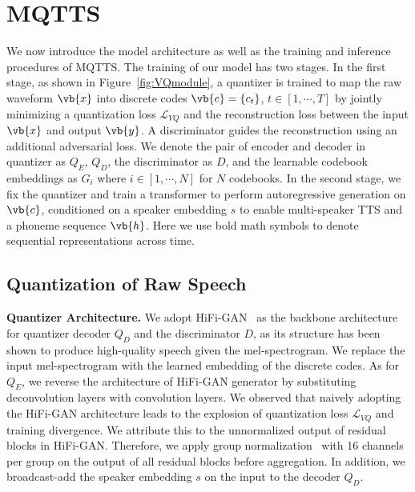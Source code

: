 \documentclass[letterpaper]{article} %
\begin{document}
\section{MQTTS}
\label{sec:model}
We now introduce the model architecture as well as the training and inference procedures of MQTTS.
The training of our model has two stages.
In the first stage, as shown in Figure~\ref{fig:VQmodule}, a quantizer is trained to map the raw waveform $\vb{x}$ into discrete codes $\vb{c}=\{c_t\}$, $t\in [1, \cdots, T]$ by jointly minimizing a quantization loss $\mathcal{L}_{VQ}$ and the reconstruction loss between the input $\vb{x}$ and output $\vb{y}$.
A discriminator  guides the reconstruction using an additional adversarial loss.
We denote the pair of encoder and decoder in quantizer as $Q_E$, $Q_D$, the discriminator as $D$, and the learnable codebook embeddings as $G_i$ where $i\in [1, \cdots, N]$ for $N$ codebooks.
In the second stage, we fix the quantizer and train a transformer to perform autoregressive generation on $\vb{c}$, conditioned on a speaker embedding $s$ to enable multi-speaker TTS and a phoneme sequence $\vb{h}$.
Here we use bold math symbols to denote sequential representations across time.

\subsection{Quantization of Raw Speech}
\label{ssec:quant}
\textbf{Quantizer Architecture.}
We adopt HiFi-GAN~\cite{10.5555/3495724.3497152} as the backbone architecture for quantizer decoder $Q_D$ and the discriminator $D$, as its structure has been shown to produce high-quality speech given the mel-spectrogram.
We replace the input mel-spectrogram with the learned embedding of the discrete codes.
As for $Q_E$, we reverse the architecture of HiFi-GAN generator by substituting deconvolution layers with convolution layers.
We observed that naively adopting the HiFi-GAN architecture leads to the explosion of quantization loss $\mathcal{L}_{VQ}$ and training divergence.
We attribute this to the unnormalized output of residual blocks in HiFi-GAN.
Therefore, we apply group normalization~\cite{DBLP:journals/ijcv/WuH20} with 16 channels per group on the output of all residual blocks before aggregation.
In addition, we broadcast-add the speaker embedding $s$ on the input to the decoder $Q_D$.
\end{document}
